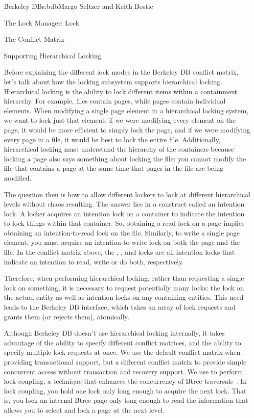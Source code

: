 \begin{aosachapter}{Berkeley DB}{s:bdb}{Margo Seltzer and Keith Bostic}
\begin{aosasect1}{The Lock Manager: Lock}
\begin{aosasect2}{The Conflict Matrix}
\end{aosasect2}

\begin{aosasect2}{Supporting Hierarchical Locking}

Before explaining the different lock modes in the Berkeley DB conflict
matrix, let's talk about how the locking subsystem supports
hierarchical locking. Hierarchical locking is the ability to lock
different items within a containment hierarchy. For example, files
contain pages, while pages contain individual elements. When modifying
a single page element in a hierarchical locking system, we want to
lock just that element; if we were modifying every element on the
page, it would be more efficient to simply lock the page, and if we
were modifying every page in a file, it would be best to lock the
entire file. Additionally, hierarchical locking must understand the
hierarchy of the containers because locking a page also says something
about locking the file: you cannot modify the file that contains a
page at the same time that pages in the file are being modified.

The question then is how to allow different lockers to lock at
different hierarchical levels without chaos resulting.  The answer
lies in a construct called an intention lock. A locker acquires an
intention lock on a container to indicate the intention to lock things
within that container. So, obtaining a read-lock on a page implies
obtaining an intention-to-read lock on the file. Similarly, to write a
single page element, you must acquire an intention-to-write lock on
both the page and the file. In the conflict matrix above, the ,
, and  locks are all intention locks that indicate an
intention to read, write or do both, respectively.

Therefore, when performing hierarchical locking, rather than
requesting a single lock on something, it is necessary to request
potentially many locks: the lock on the actual entity as well as
intention locks on any containing entities. This need leads to the
Berkeley DB  interface, which
takes an array of lock requests and grants them (or rejects them),
atomically.

Although Berkeley DB doesn't use hierarchical locking internally, it
takes advantage of the ability to specify different conflict
matrices, and the ability to specify multiple lock requests at once.
We use the default conflict matrix when providing transactional
support, but a different conflict matrix to provide simple concurrent
access without transaction and recovery support.  We use 
 to perform lock
coupling, a technique that enhances the concurrency of Btree
traversals~\cite{bib:comer:btree}.  In lock coupling, you hold
one lock only long enough to acquire the next lock.  That is, you lock
an internal Btree page only long enough to read the information that
allows you to select and lock a page at the next level.


\end{aosasect2}
\end{aosasect1}
\end{aosachapter}

